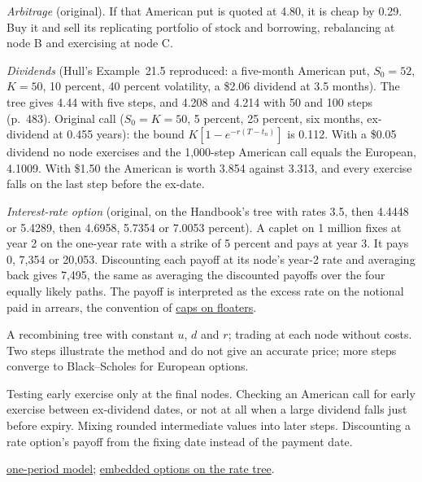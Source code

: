 \begin{qfmethod}
\emph{Arbitrage} (original). If that American put is quoted at 4.80, it is cheap by 0.29. Buy it and sell its replicating portfolio of stock and borrowing, rebalancing at node B and exercising at node C.

\emph{Dividends} (Hull's Example~21.5 reproduced: a five-month American put, $S_0=52$, $K=50$, 10 percent, 40 percent volatility, a \$2.06 dividend at 3.5 months). The tree gives 4.44 with five steps, and 4.208 and 4.214 with 50 and 100 steps (p.~483). Original call ($S_0=K=50$, 5 percent, 25 percent, six months, ex-dividend at 0.455 years): the bound $K[1-e^{-r(T-t_n)}]$ is 0.112. With a \$0.05 dividend no node exercises and the 1{,}000-step American call equals the European, 4.1009. With \$1.50 the American is worth 3.854 against 3.313, and every exercise falls on the last step before the ex-date.

\emph{Interest-rate option} (original, on the Handbook's tree with rates 3.5, then 4.4448 or 5.4289, then 4.6958, 5.7354 or 7.0053 percent). A caplet on 1 million fixes at year 2 on the one-year rate with a strike of 5 percent and pays at year 3. It pays 0, 7{,}354 or 20{,}053. Discounting each payoff at its node's year-2 rate and averaging back gives 7{,}495, the same as averaging the discounted payoffs over the four equally likely paths. The payoff is interpreted as the excess rate on the notional paid in arrears, the convention of \hyperref[meth:capped-floored-floater-valuation]{caps on floaters}.

 A recombining tree with constant $u$, $d$ and $r$; trading at each node without costs. Two steps illustrate the method and do not give an accurate price; more steps converge to Black--Scholes for European options.

 Testing early exercise only at the final nodes. Checking an American call for early exercise between ex-dividend dates, or not at all when a large dividend falls just before expiry. Mixing rounded intermediate values into later steps. Discounting a rate option's payoff from the fixing date instead of the payment date.

 \hyperref[meth:one-period-binomial-valuation]{one-period model}; \hyperref[meth:callable-putable-bond-valuation]{embedded options on the rate tree}.

\end{qfmethod}

